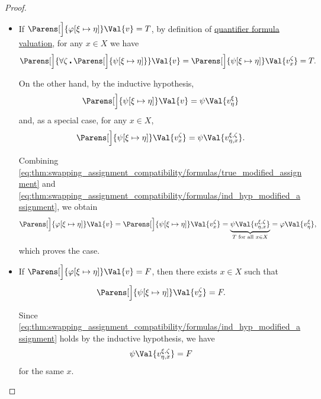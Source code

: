 \begin{proof}
\begin{itemize}
\begin{itemize}
      \begin{itemize}
        \item If \( \Parens[\Big]{\varphi[\xi \mapsto \eta]}\Val{v} = T \), by definition of \hyperref[def:first_order_valuation/formula_valuation]{quantifier formula valuation}, for any \( x \in X \) we have
        \begin{equation}\label{eq:thm:swapping_assignment_compatibility/formulas/true_modified_assignment}
          \Parens[\Big]{\forall \zeta \centerdot \Parens[\Big]{ \psi[\xi \mapsto \eta] }}\Val{v}
          =
          \Parens[\Big]{\psi[\xi \mapsto \eta]}\Val{v_x^\zeta}
          =
          T.
        \end{equation}

        On the other hand, by the inductive hypothesis,
        \begin{equation*}
          \Parens[\Big]{ \psi[\xi \mapsto \eta] }\Val{v} = \psi\Val{v_\eta^\xi}
        \end{equation*}
        and, as a special case, for any \( x \in X \),
        \begin{equation}\label{eq:thm:swapping_assignment_compatibility/formulas/ind_hyp_modified_assignment}
          \Parens[\Big]{ \psi[\xi \mapsto \eta] }\Val{v_x^\zeta} = \psi\Val{v_{\eta,x}^{\xi,\zeta}}.
        \end{equation}

        Combining \eqref{eq:thm:swapping_assignment_compatibility/formulas/true_modified_assignment} and \eqref{eq:thm:swapping_assignment_compatibility/formulas/ind_hyp_modified_assignment}, we obtain
        \begin{equation*}
          \Parens[\Big]{ \varphi[\xi \mapsto \eta] }\Val{v}
          =
          \Parens[\Big]{ \psi[\xi \mapsto \eta] }\Val{v_x^\zeta}
          =
          \underbrace{\psi\Val{v_{\eta,x}^{\xi,\zeta}}}_{T \T{for all} x \in X}
          =
          \varphi\Val{v_\eta^\xi},
        \end{equation*}
        which proves the case.

        \item If \( \Parens[\Big]{\varphi[\xi \mapsto \eta]}\Val{v} = F \), then there exists \( x \in X \) such that
        \begin{equation*}
          \Parens[\Big]{\psi[\xi \mapsto \eta]}\Val{v_x^\zeta} = F.
        \end{equation*}

        Since \eqref{eq:thm:swapping_assignment_compatibility/formulas/ind_hyp_modified_assignment} holds by the inductive hypothesis, we have
        \begin{equation*}
          \psi\Val{v_{\eta,x}^{\xi,\zeta}} = F
        \end{equation*}
        for the same \( x \).


\end{itemize}
\end{itemize}
\end{itemize}
\end{proof}
